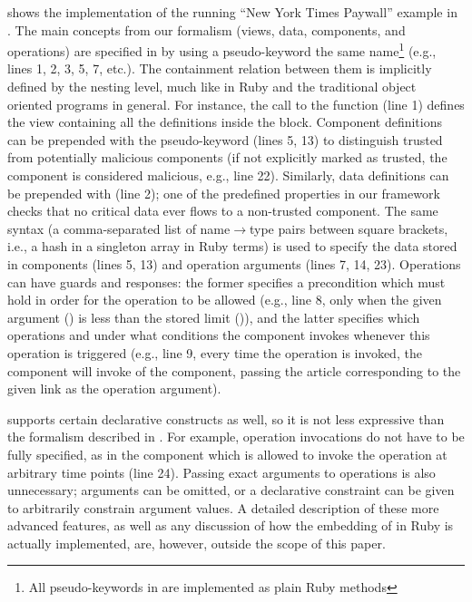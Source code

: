  shows the implementation of the running
``New York Times Paywall'' example in \sLang.  The main concepts from
our formalism (views, data, components, and operations) are specified
in \sLang by using a pseudo-keyword the same name\footnote{All
  pseudo-keywords in \sLang are implemented as plain Ruby methods}
(e.g., lines 1, 2, 3, 5, 7, etc.).  The containment relation between
them is implicitly defined by the nesting level, much like in Ruby and
the traditional object oriented programs in general.  For instance,
the call to the  function (line 1) defines the
 view containing all the definitions inside the
 block.  Component definitions can be prepended with
the  pseudo-keyword (lines 5, 13) to distinguish
trusted from potentially malicious components (if not explicitly
marked as trusted, the component is considered malicious, e.g., line
22).  Similarly, data definitions can be prepended with
 (line 2); one of the predefined properties in our
framework checks that no critical data ever flows to a non-trusted
component.  The same syntax (a comma-separated list of
name$\rightarrow$type pairs between square brackets, i.e., a hash in a
singleton array in Ruby terms) is used to specify the data stored in
components (lines 5, 13) and operation arguments (lines 7, 14, 23).
Operations can have guards and responses: the former specifies a
precondition which must hold in order for the operation to be allowed
(e.g., line 8, only when the given argument () is
less than the stored limit ()), and the latter specifies
which operations and under what conditions the component invokes
whenever this operation is triggered (e.g., line 9, every time the
 operation is invoked, the  component will
invoke  of the  component, passing the
article corresponding to the given link as the operation argument).

\sLang supports certain declarative constructs as well, so it is not
less expressive than the formalism described in
.  For example, operation invocations do not
have to be fully specified, as in the  component which is
allowed to invoke the  operation at arbitrary time
points (line 24).  Passing exact arguments to operations is also
unnecessary; arguments can be omitted, or a declarative constraint can
be given to arbitrarily constrain argument values.  A detailed
description of these more advanced features, as well as any discussion
of how the embedding of \sLang in Ruby is actually implemented, are,
however, outside the scope of this paper.
